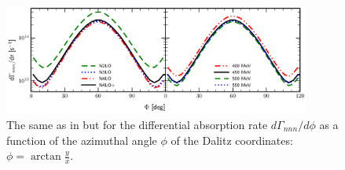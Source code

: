     \begin{figure}[h]
        \begin{center}
        \includegraphics[width=0.9\textwidth]{PlotData/PION/Dalitz_maps/figures/3H_dGdphi.pdf}
        \end{center}
        \caption{The same as in  but for the differential absorption rate $d\Gamma_{nnn} /d\phi$
        as a function of the azimuthal angle $\phi$ of the Dalitz coordinates: $\phi = \arctan \frac{y}{x}$.}
        \label{pion_dGdphi_3H}
    \end{figure}
